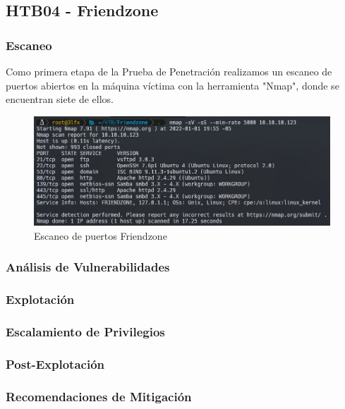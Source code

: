 \subsection{HTB04 - Friendzone}

    \subsubsection{Escaneo}
        \large{Como primera etapa de la Prueba de Penetración realizamos un escaneo de puertos abiertos en la máquina víctima con la herramienta "Nmap", donde se encuentran siete de ellos.}
        \par
        \begin{figure}[h!]
            \centering
            \includegraphics[width=0.99\textwidth]{informe4/imagenes/friendzone/01_escaneo.png}
            \caption{Escaneo de puertos Friendzone} 
        \end{figure}  

    \subsubsection{Análisis de Vulnerabilidades}

    \subsubsection{Explotación}

    \subsubsection{Escalamiento de Privilegios}

    \subsubsection{Post-Explotación}

    \subsubsection{Recomendaciones de Mitigación}

